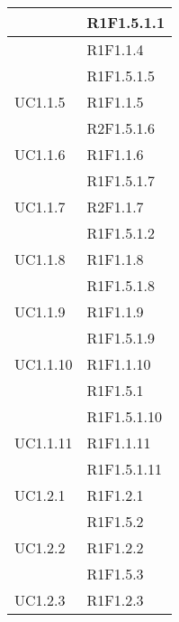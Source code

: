 \begin{longtable}{|>{\centering}m{5cm}|m{5cm}<{\centering}|}
&{R1F1.5.1.1}\\ \hline
{UC1.1.4}&{R1F1.1.4}\\
&{R1F1.5.1.5}\\ \hline
{UC1.1.5}&{R1F1.1.5}\\
&{R2F1.5.1.6}\\ \hline
{UC1.1.6}&{R1F1.1.6}\\
&{R1F1.5.1.7}\\ \hline
{UC1.1.7}&{R2F1.1.7}\\
&{R1F1.5.1.2}\\ \hline
{UC1.1.8}&{R1F1.1.8}\\
&{R1F1.5.1.8}\\ \hline
{UC1.1.9}&{R1F1.1.9}\\
&{R1F1.5.1.9}\\ \hline
{UC1.1.10}&{R1F1.1.10}\\
&{R1F1.5.1}\\
&{R1F1.5.1.10}\\ \hline
{UC1.1.11}&{R1F1.1.11}\\
&{R1F1.5.1.11}\\ \hline

{UC1.2.1}&{R1F1.2.1}\\
&{R1F1.5.2}\\ \hline
{UC1.2.2}&{R1F1.2.2}\\
&{R1F1.5.3}\\ \hline
{UC1.2.3}&{R1F1.2.3}\\ \hline


\end{longtable}
